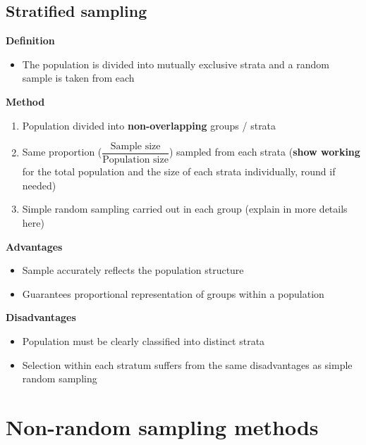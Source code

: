 \subsection{Stratified sampling}
\textbf{Definition}
\begin{itemize}
	\item The population is divided into mutually exclusive strata and a random sample is taken from each
\end{itemize}
\textbf{Method}
\begin{enumerate}
	\item Population divided into \textbf{non-overlapping} groups / strata
	\item Same proportion ($\dfrac{\text{Sample size}}{\text{Population size}}$) sampled from each strata (\textbf{show working} for the total population and the size of each strata individually, round if needed)
	\item Simple random sampling carried out in each group (explain in more details here)
\end{enumerate}
\textbf{Advantages}
\begin{itemize}
	\item Sample accurately reflects the population structure
	\item Guarantees proportional representation of groups within a population
\end{itemize}
\textbf{Disadvantages}
\begin{itemize}
	\item Population must be clearly classified into distinct strata
	\item Selection within each stratum suffers from the same disadvantages as simple random sampling
\end{itemize}
\section{Non-random sampling methods}
